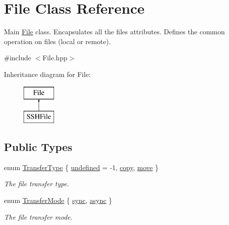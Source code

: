 \hypertarget{classFile}{
\section{File Class Reference}
\label{classFile}
}


Main \hyperlink{classFile}{File} class. Encapsulates all the files attributes. Defines the common operation on files (local or remote).  




{\ttfamily \#include $<$File.hpp$>$}

Inheritance diagram for File:\begin{figure}[H]
\begin{center}
\leavevmode
\includegraphics[height=2.000000cm]{classFile}
\end{center}
\end{figure}
\subsection*{Public Types}
\begin{DoxyCompactItemize}
\item 
enum \hyperlink{classFile_a6b5e0e4ca04b9983349e02866ff1c659}{TransferType} \{ \hyperlink{classFile_a6b5e0e4ca04b9983349e02866ff1c659a9269c2b4253efd45676b11ad9e963d38}{undefined} = -\/1, 
\hyperlink{classFile_a6b5e0e4ca04b9983349e02866ff1c659a82cfd632fe096ab570cd8f64b69e4df5}{copy}, 
\hyperlink{classFile_a6b5e0e4ca04b9983349e02866ff1c659a00895022294873a8ad0b1030e2b5d1ea}{move}
 \}
\begin{DoxyCompactList}\small\item\em The file transfer type. \item\end{DoxyCompactList}\item 
enum \hyperlink{classFile_a4295512b0ee27752fb5ee313155499cc}{TransferMode} \{ \hyperlink{classFile_a4295512b0ee27752fb5ee313155499cca8c6ef20805ae2b316a75d1e6921c01b8}{sync}, 
\hyperlink{classFile_a4295512b0ee27752fb5ee313155499ccaad05772127fa058068c3ec4574cbd180}{async}
 \}
\begin{DoxyCompactList}\small\item\em The file transfer mode. \item\end{DoxyCompactList}\end{DoxyCompactItemize}
